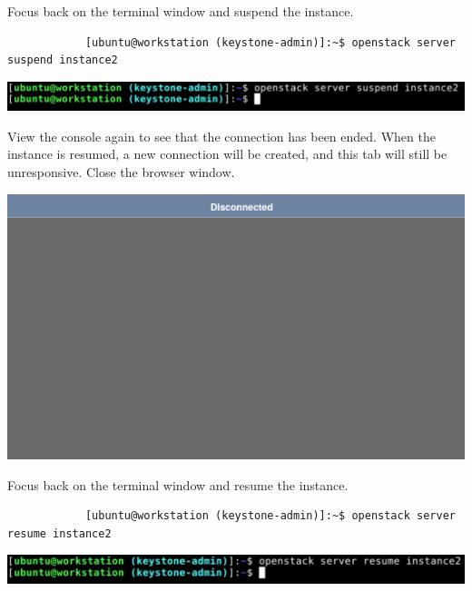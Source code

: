 \documentclass[letterpaper, 12pt]{article}
\begin{document}
\begin{enumerate}
    \begin{labstep}
        Focus back on the terminal window and suspend the instance.
        \begin{lstlisting}
            [ubuntu@workstation (keystone-admin)]:~$ openstack server suspend instance2
        \end{lstlisting}

        \begin{center}
            \includegraphics[width=\linewidth]{images/part4/step10.png}
        \end{center}
    \end{labstep}

    \begin{labstep}
        View the console again to see that the connection has been ended.
        When the instance is resumed, a new connection will be created, and this tab will still be unresponsive.
        Close the browser window.

        \begin{center}
            \includegraphics[width=\linewidth]{images/part4/step11.png}
        \end{center}
    \end{labstep}

    \begin{labstep}
        Focus back on the terminal window and resume the instance.
        \begin{lstlisting}
            [ubuntu@workstation (keystone-admin)]:~$ openstack server resume instance2
        \end{lstlisting}

        \begin{center}
            \includegraphics[width=\linewidth]{images/part4/step12.png}
        \end{center}
    \end{labstep}


\end{enumerate}
\end{document}
